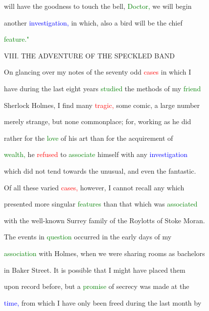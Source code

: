 will have the \textcolor{BurntOrange}{goodness} to touch the bell, \textcolor{green}{Doctor,} we will begin

 another \textcolor{blue}{investigation,} in which, also a bird will be the chief

 \textcolor{green}{feature."}







 VIII. THE \textcolor{BurntOrange}{ADVENTURE} OF THE SPECKLED BAND



 On glancing over my notes of the seventy odd \textcolor{red}{cases} in which I

 have during the last eight years \textcolor{green}{studied} the methods of my \textcolor{green}{friend}

 Sherlock Holmes, I find many \textcolor{red}{tragic,} some comic, a large number

 merely strange, but none \textcolor{BurntOrange}{commonplace;} for, working as he did

 rather for the \textcolor{green}{love} of his \textcolor{BurntOrange}{art} than for the acquirement of

 \textcolor{green}{wealth,} he \textcolor{red}{refused} to \textcolor{green}{associate} himself with any \textcolor{blue}{investigation}

 which did not tend towards the unusual, and even the fantastic.

 Of all these varied \textcolor{red}{cases,} however, I cannot recall any which

 \textcolor{BurntOrange}{presented} more singular \textcolor{green}{features} than that which was \textcolor{green}{associated}

 with the well-known Surrey family of the Roylotts of Stoke Moran.

 The events in \textcolor{green}{question} occurred in the early days of my

 \textcolor{green}{association} with Holmes, when we were \textcolor{BurntOrange}{sharing} rooms as bachelors

 in Baker Street. It is possible that I might have placed them

 upon record before, but a \textcolor{green}{promise} of \textcolor{BurntOrange}{secrecy} was made at the

 \textcolor{blue}{time,} from which I have only been freed during the last month by

